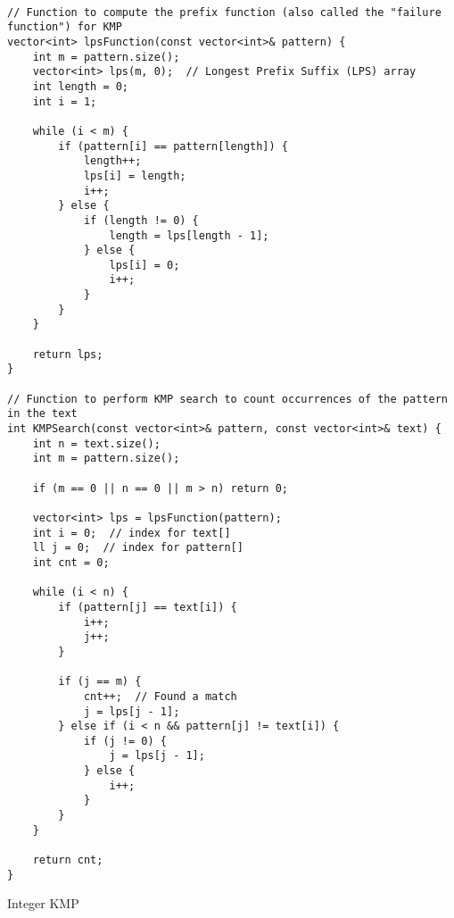 \documentclass{article}
\begin{document}
\begin{lstlisting}

// Function to compute the prefix function (also called the "failure function") for KMP
vector<int> lpsFunction(const vector<int>& pattern) {
    int m = pattern.size();
    vector<int> lps(m, 0);  // Longest Prefix Suffix (LPS) array
    int length = 0;
    int i = 1;

    while (i < m) {
        if (pattern[i] == pattern[length]) {
            length++;
            lps[i] = length;
            i++;
        } else {
            if (length != 0) {
                length = lps[length - 1];
            } else {
                lps[i] = 0;
                i++;
            }
        }
    }

    return lps;
}

// Function to perform KMP search to count occurrences of the pattern in the text
int KMPSearch(const vector<int>& pattern, const vector<int>& text) {
    int n = text.size();
    int m = pattern.size();

    if (m == 0 || n == 0 || m > n) return 0;

    vector<int> lps = lpsFunction(pattern);
    int i = 0;  // index for text[]
    ll j = 0;  // index for pattern[]
    int cnt = 0;

    while (i < n) {
        if (pattern[j] == text[i]) {
            i++;
            j++;
        }

        if (j == m) {
            cnt++;  // Found a match
            j = lps[j - 1];
        } else if (i < n && pattern[j] != text[i]) {
            if (j != 0) {
                j = lps[j - 1];
            } else {
                i++;
            }
        }
    }

    return cnt;
}

\end{lstlisting}

Integer KMP
\end{document}
